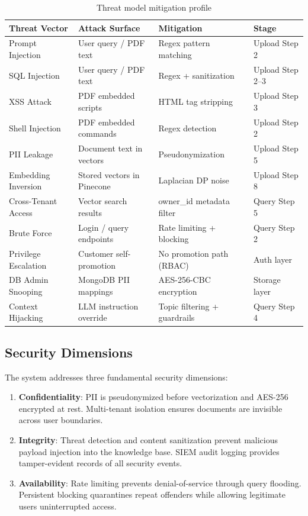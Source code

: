 \begin{table}[H]
\centering
\caption{Threat model mitigation profile}
\label{tab:threat_model}
\small
\begin{tabular}{llll}
\toprule
\textbf{Threat Vector} & \textbf{Attack Surface} & \textbf{Mitigation} & \textbf{Stage} \\
\midrule
Prompt Injection & User query / PDF text & Regex pattern matching & Upload Step 2 \\
SQL Injection & User query / PDF text & Regex + sanitization & Upload Step 2--3 \\
XSS Attack & PDF embedded scripts & HTML tag stripping & Upload Step 3 \\
Shell Injection & PDF embedded commands & Regex detection & Upload Step 2 \\
PII Leakage & Document text in vectors & Pseudonymization & Upload Step 5 \\
Embedding Inversion & Stored vectors in Pinecone & Laplacian DP noise & Upload Step 8 \\
Cross-Tenant Access & Vector search results & owner\_id metadata filter & Query Step 5 \\
Brute Force & Login / query endpoints & Rate limiting + blocking & Query Step 2 \\
Privilege Escalation & Customer self-promotion & No promotion path (RBAC) & Auth layer \\
DB Admin Snooping & MongoDB PII mappings & AES-256-CBC encryption & Storage layer \\
Context Hijacking & LLM instruction override & Topic filtering + guardrails & Query Step 4 \\
\bottomrule
\end{tabular}
\end{table}

\subsection{Security Dimensions}

The system addresses three fundamental security dimensions:

\begin{enumerate}
    \item \textbf{Confidentiality}: PII is pseudonymized before vectorization and AES-256 encrypted at rest. Multi-tenant isolation ensures documents are invisible across user boundaries.
    
    \item \textbf{Integrity}: Threat detection and content sanitization prevent malicious payload injection into the knowledge base. SIEM audit logging provides tamper-evident records of all security events.
    
    \item \textbf{Availability}: Rate limiting prevents denial-of-service through query flooding. Persistent blocking quarantines repeat offenders while allowing legitimate users uninterrupted access.
\end{enumerate}

